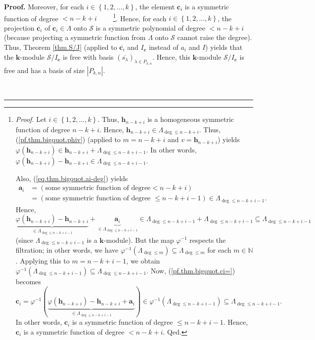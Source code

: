 \documentclass[numbers=enddot,12pt,final,onecolumn,notitlepage]{scrartcl}%
\theoremstyle{definition}
\newenvironment{proof}[1][Proof]{\noindent\textbf{#1.} }{\ \rule{0.5em}{0.5em}}
\begin{document}
\begin{proof}
Moreover, for each $i\in\left\{  1,2,\ldots,k\right\}  $, the element
$\mathbf{c}_{i}$ is a symmetric function of degree $<n-k+i$%
\ \ \ \ \footnote{\textit{Proof.} Let $i\in\left\{  1,2,\ldots,k\right\}  $.
Thus, $\mathbf{h}_{n-k+i}$ is a homogeneous symmetric function of degree
$n-k+i$. Hence, $\mathbf{h}_{n-k+i}\in\Lambda_{\deg\leq n-k+i}$. Thus,
(\ref{pf.thm.bigquot.phiv}) (applied to $m=n-k+i$ and $v=\mathbf{h}_{n-k+i}$)
yields $\varphi\left(  \mathbf{h}_{n-k+i}\right)  \in\mathbf{h}_{n-k+i}%
+\Lambda_{\deg\leq n-k+i-1}$. In other words, $\varphi\left(  \mathbf{h}%
_{n-k+i}\right)  -\mathbf{h}_{n-k+i}\in\Lambda_{\deg\leq n-k+i-1}$.
\par
Also, (\ref{eq.thm.bigquot.ai-deg}) yields%
\begin{align*}
\mathbf{a}_{i}  &  =\left(  \text{some symmetric function of degree
}<n-k+i\right) \\
&  =\left(  \text{some symmetric function of degree }\leq n-k+i-1\right)
\in\Lambda_{\deg\leq n-k+i-1}.
\end{align*}
Hence,
\[
\underbrace{\varphi\left(  \mathbf{h}_{n-k+i}\right)  -\mathbf{h}_{n-k+i}%
}_{\in\Lambda_{\deg\leq n-k+i-1}}+\underbrace{\mathbf{a}_{i}}_{\in
\Lambda_{\deg\leq n-k+i-1}}\in\Lambda_{\deg\leq n-k+i-1}+\Lambda_{\deg\leq
n-k+i-1}\subseteq\Lambda_{\deg\leq n-k+i-1}%
\]
(since $\Lambda_{\deg\leq n-k+i-1}$ is a $\mathbf{k}$-module). But the map
$\varphi^{-1}$ respects the filtration; in other words, we have $\varphi
^{-1}\left(  \Lambda_{\deg\leq m}\right)  \subseteq\Lambda_{\deg\leq m}$ for
each $m\in\mathbb{N}$. Applying this to $m=n-k+i-1$, we obtain $\varphi
^{-1}\left(  \Lambda_{\deg\leq n-k+i-1}\right)  \subseteq\Lambda_{\deg\leq
n-k+i-1}$. Now, (\ref{pf.thm.bigquot.ci=}) becomes%
\[
\mathbf{c}_{i}=\varphi^{-1}\left(  \underbrace{\varphi\left(  \mathbf{h}%
_{n-k+i}\right)  -\mathbf{h}_{n-k+i}+\mathbf{a}_{i}}_{\in\Lambda_{\deg\leq
n-k+i-1}}\right)  \in\varphi^{-1}\left(  \Lambda_{\deg\leq n-k+i-1}\right)
\subseteq\Lambda_{\deg\leq n-k+i-1}.
\]
In other words, $\mathbf{c}_{i}$ is a symmetric function of degree $\leq
n-k+i-1$. Hence, $\mathbf{c}_{i}$ is a symmetric function of degree $<n-k+i$.
Qed.}. Hence, for each $i\in\left\{  1,2,\ldots,k\right\}  $, the projection
$\overline{\mathbf{c}_{i}}$ of $\mathbf{c}_{i}\in\Lambda$ onto $\mathcal{S}$
is a symmetric polynomial of degree $<n-k+i$ (because projecting a symmetric
function from $\Lambda$ onto $\mathcal{S}$ cannot raise the degree). Thus,
Theorem \ref{thm.S/J} (applied to $\overline{\mathbf{c}_{i}}$ and
$I_{\mathbf{c}}$ instead of $a_{i}$ and $I$) yields that the $\mathbf{k}%
$-module $\mathcal{S}/I_{\mathbf{c}}$ is free with basis $\left(
\overline{s_{\lambda}}\right)  _{\lambda\in P_{k,n}}$. Hence, this
$\mathbf{k}$-module $\mathcal{S}/I_{\mathbf{c}}$ is free and has a basis of
size $\left\vert P_{k,n}\right\vert $.


\end{proof}
\end{document}
